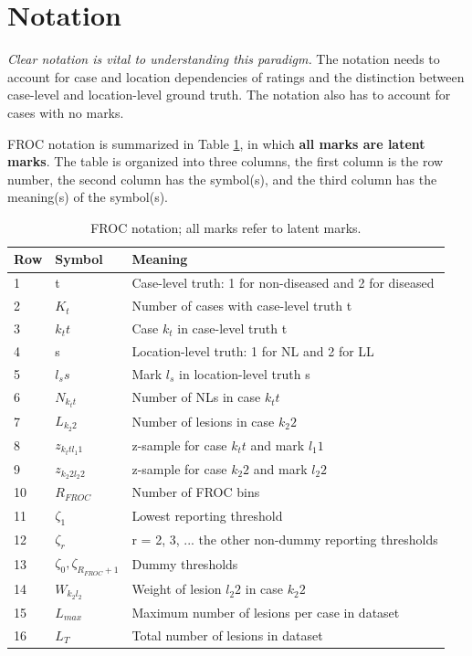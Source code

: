 \documentclass[
]{book}
\begin{document}
\hypertarget{froc-empirical-notation}{%
\section{Notation}\label{froc-empirical-notation}}

\emph{Clear notation is vital to understanding this paradigm.} The notation needs to account for case and location dependencies of ratings and the distinction between case-level and location-level ground truth. The notation also has to account for cases with no marks.

FROC notation is summarized in Table \ref{tab:froc-empirical-notation}, in which \textbf{all marks are latent marks}. The table is organized into three columns, the first column is the row number, the second column has the symbol(s), and the third column has the meaning(s) of the symbol(s).

\begin{table}

\caption{\label{tab:froc-empirical-notation}FROC notation; all marks refer to latent marks.}
\centering
\begin{tabular}[t]{l|l|l}
\hline
Row & Symbol & Meaning\\
\hline
1 & t & Case-level truth: 1 for non-diseased and 2 for diseased\\
\hline
2 & $K_t$ & Number of cases with case-level truth t\\
\hline
3 & $k_t t$ & Case $k_t$ in case-level truth t\\
\hline
4 & s & Location-level truth: 1 for NL and 2 for LL\\
\hline
5 & $l_s s$ & Mark $l_s$ in location-level truth s\\
\hline
6 & $N_{k_t t}$ & Number of NLs in case $k_t t$\\
\hline
7 & $L_{k_2 2}$ & Number of lesions in case $k_2 2$\\
\hline
8 & $z_{k_t t l_1 1}$ & z-sample for case $k_t t$ and mark $l_1 1$\\
\hline
9 & $z_{k_2 2 l_2 2}$ & z-sample for case $k_2 2$ and mark $l_2 2$\\
\hline
10 & $R_{FROC}$ & Number of FROC bins\\
\hline
11 & $\zeta_1$ & Lowest reporting threshold\\
\hline
12 & $\zeta_r$ & r = 2, 3, ... the other non-dummy reporting thresholds\\
\hline
13 & $\zeta_0, \zeta_{R_{FROC}+1}$ & Dummy thresholds\\
\hline
14 & $W_{k_2 l_2}$ & Weight of lesion $l_2 2$ in case $k_2 2$\\
\hline
15 & $L_{max}$ & Maximum number of lesions per case in dataset\\
\hline
16 & $L_T$ & Total number of lesions in dataset\\
\hline
\end{tabular}
\end{table}
\end{document}
